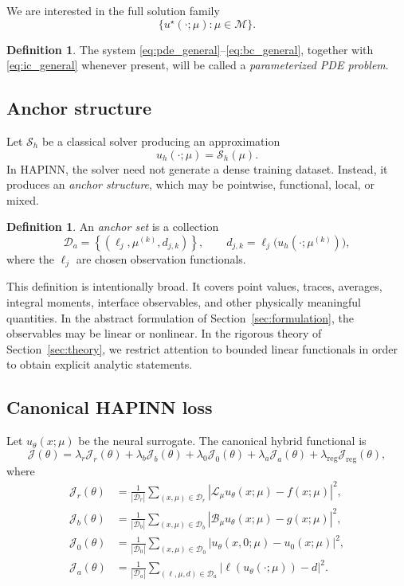 \documentclass[preprint,12pt]{elsarticle}
\theoremstyle{definition}
\newtheorem{definition}[theorem]{Definition}
\numberwithin{equation}{section}
\newcommand{\cL}{\mathcal{L}}
\newcommand{\cB}{\mathcal{B}}
\newcommand{\cS}{\mathcal{S}}
\newcommand{\cM}{\mathcal{M}}
\newcommand{\cD}{\mathcal{D}}
\newcommand{\cJ}{\mathcal{J}}
\newcommand{\abs}[1]{\left\lvert #1 \right\rvert}
\begin{document}
We are interested in the full solution family
\[
\{u^\star(\cdot;\mu)\colon \mu\in\cM\}.
\]

\begin{definition}
The system \eqref{eq:pde_general}--\eqref{eq:bc_general}, together with \eqref{eq:ic_general} whenever present, will be called a \emph{parameterized PDE problem}.
\end{definition}

\subsection{Anchor structure}

Let $\cS_h$ be a classical solver producing an approximation
\[
u_h(\cdot;\mu)=\cS_h(\mu).
\]
In HAPINN, the solver need not generate a dense training dataset. Instead, it produces an \emph{anchor structure}, which may be pointwise, functional, local, or mixed.

\begin{definition}
An \emph{anchor set} is a collection
\[
\cD_a=\left\{(\ell_j,\mu^{(k)},d_{j,k})\right\},
\qquad
d_{j,k}=\ell_j\bigl(u_h(\cdot;\mu^{(k)})\bigr),
\]
where the $\ell_j$ are chosen observation functionals.
\end{definition}

This definition is intentionally broad. It covers point values, traces, averages, integral moments, interface observables, and other physically meaningful quantities. In the abstract formulation of Section~\ref{sec:formulation}, the observables may be linear or nonlinear. In the rigorous theory of Section~\ref{sec:theory}, we restrict attention to bounded linear functionals in order to obtain explicit analytic statements.

\subsection{Canonical HAPINN loss}

Let $u_\theta(x;\mu)$ be the neural surrogate. The canonical hybrid functional is
\begin{equation}
\cJ(\theta)=
\lambda_r\cJ_r(\theta)+
\lambda_b\cJ_b(\theta)+
\lambda_0\cJ_0(\theta)+
\lambda_a\cJ_a(\theta)+
\lambda_{\mathrm{reg}}\cJ_{\mathrm{reg}}(\theta),
\label{eq:HAPINNloss}
\end{equation}
where
\begin{align}
\cJ_r(\theta)
&=
\frac{1}{|\cD_r|}
\sum_{(x,\mu)\in\cD_r}
\abs{\cL_\mu u_\theta(x;\mu)-f(x;\mu)}^2,
\label{eq:Jr}\\
\cJ_b(\theta)
&=
\frac{1}{|\cD_b|}
\sum_{(x,\mu)\in\cD_b}
\abs{\cB_\mu u_\theta(x;\mu)-g(x;\mu)}^2,
\label{eq:Jb}\\
\cJ_0(\theta)
&=
\frac{1}{|\cD_0|}
\sum_{(x,\mu)\in\cD_0}
\abs{u_\theta(x,0;\mu)-u_0(x;\mu)}^2,
\label{eq:J0}\\
\cJ_a(\theta)
&=
\frac{1}{|\cD_a|}
\sum_{(\ell,\mu,d)\in\cD_a}
\abs{\ell(u_\theta(\cdot;\mu))-d}^2.
\label{eq:Ja}
\end{align}
\end{document}
